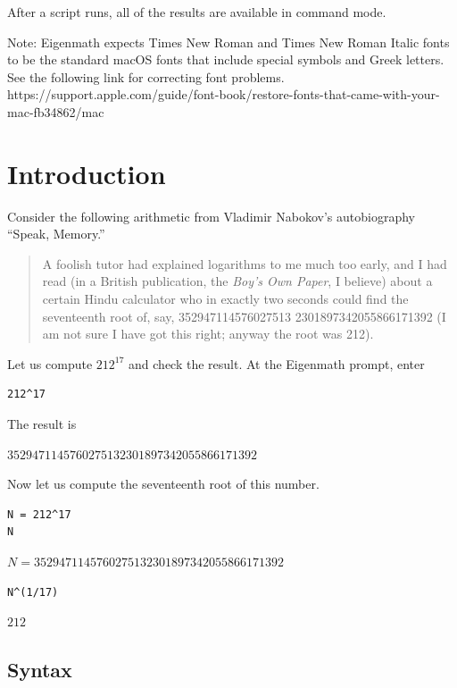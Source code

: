 \documentclass[12pt]{article}
\begin{document}
After a script runs, all of the results are available in command mode.

\bigskip
Note: Eigenmath expects Times New Roman and Times New Roman Italic fonts
to be the standard macOS fonts that include special symbols and Greek letters.
See the following link for correcting font problems.\newline
{\scriptsize
https://support.apple.com/guide/font-book/restore-fonts-that-came-with-your-mac-fb34862/mac
}

\section{Introduction}

Consider the following arithmetic from Vladimir Nabokov's autobiography ``Speak, Memory.''

\begin{quote}
A foolish tutor had explained logarithms to me much too early, and I had
read (in a British publication, the {\it Boy's Own Paper}, I believe)
about a certain Hindu calculator who in exactly two seconds could find the
seventeenth root of, say,
352947114576027513 2301897342055866171392
(I am not sure I have got this right; anyway the root was 212).
\end{quote}

Let us compute $212^{17}$ and check the result.
At the Eigenmath prompt, enter

{\color{blue}
\begin{verbatim}
212^17
\end{verbatim}
}

The result is

\bigskip

$\displaystyle 3529471145760275132301897342055866171392$

\bigskip

Now let us compute the seventeenth root of this number.

{\color{blue}
\begin{verbatim}
N = 212^17
N
\end{verbatim}
}

$\displaystyle N=3529471145760275132301897342055866171392$

{\color{blue}
\begin{verbatim}
N^(1/17)
\end{verbatim}
}

$\displaystyle 212$

\subsection{Syntax}
\end{document}

